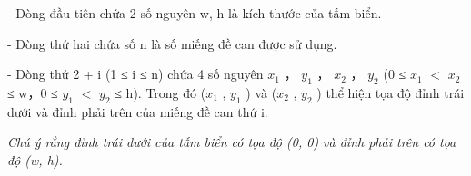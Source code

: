 - Dòng đầu tiên chứa 2 số nguyên w, h là kích thước của tấm biển.   


   - Dòng thứ hai chứa số n là số miếng đề can được sử dụng.   


   - Dòng thứ 2 + i (1 ≤ i ≤ n) chứa 4 số nguyên $x_{1}$   ， $y_{1}$   ， $x_{2}$   ， $y_{2}$   (0 ≤ $x_{1}$   $<$ $x_{2}$   ≤ w，0 ≤ $y_{1}$   $<$ $y_{2}$   ≤ h). Trong đó ($x_{1}$   , $y_{1}$   ) và ($x_{2}$   , $y_{2}$   ) thể hiện tọa độ đỉnh trái dưới và đỉnh phải trên của miếng đề can thứ i.   


\textit{     Chú ý rằng đỉnh trái dưới của tấm biển có tọa độ (0, 0) và đỉnh phải trên có tọa độ (w, h).    }